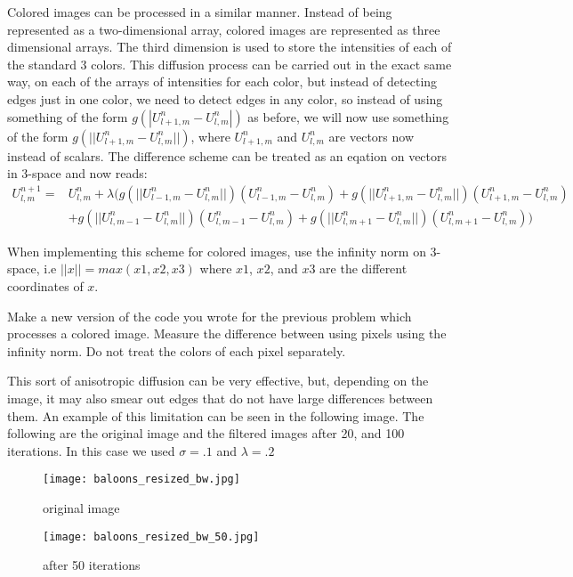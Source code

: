 Colored images can be processed in a similar manner.
Instead of being represented as a two-dimensional array, colored images are represented as three dimensional arrays.
The third dimension is used to store the intensities of each of the standard 3 colors.
This diffusion process can be carried out in the exact same way, on each of the arrays of intensities for each color, but instead of detecting edges just in one color, we need to detect edges in any color, so instead of using something of the form $g(|U_{l+1,m}^n - U_{l,m}^n|)$ as before, we will now use something of the form $g(||U_{l+1,m}^n - U_{l,m}^n||)$, where $U_{l+1,m}^n$ and $U_{l,m}^n$ are vectors now instead of scalars.
The difference scheme can be treated as an eqation on vectors in 3-space and now reads:
\begin{equation*}
\begin{split}
U_{l,m}^{n+1} =& U_{l,m}^n + \lambda (g(||U_{l-1,m}^n - U_{l,m}^n||)(U_{l-1,m}^n - U_{l,m}^n) + g(||U_{l+1,m}^n - U_{l,m}^n||)(U_{l+1,m}^n - U_{l,m}^n) \\
 &+ g(||U_{l,m-1}^n - U_{l,m}^n||)(U_{l,m-1}^n - U_{l,m}^n) + g(||U_{l,m+1}^n - U_{l,m}^n||)(U_{l,m+1}^n - U_{l,m}^n))
\end{split}
\end{equation*}

When implementing this scheme for colored images, use the infinity norm on 3-space, i.e $||x||=max(x1,x2,x3)$ where $x1$, $x2$, and $x3$ are the different coordinates of $x$.

\begin{problem}
Make a new version of the code you wrote for the previous problem which processes a colored image.
Measure the difference between using pixels using the infinity norm.
Do not treat the colors of each pixel separately.
\end{problem}

This sort of anisotropic diffusion can be very effective, but, depending on the image, it may also smear out edges that do not have large differences between them.
An example of this limitation can be seen in the following image.
The following are the original image and the filtered images after 20, and 100 iterations.
In this case we used $\sigma = .1$ and $\lambda = .2$

\begin{figure}[ht]
\begin{minipage}[b]{.45\linewidth}
\centering
\texttt{[image: baloons\_resized\_bw.jpg]}
\caption*{original image}
\end{minipage}
\hspace{0.5cm}
\begin{minipage}[b]{0.45\linewidth}
\centering
\texttt{[image: baloons\_resized\_bw\_50.jpg]}
\caption*{after 50 iterations}
\end{minipage}
\end{figure}


